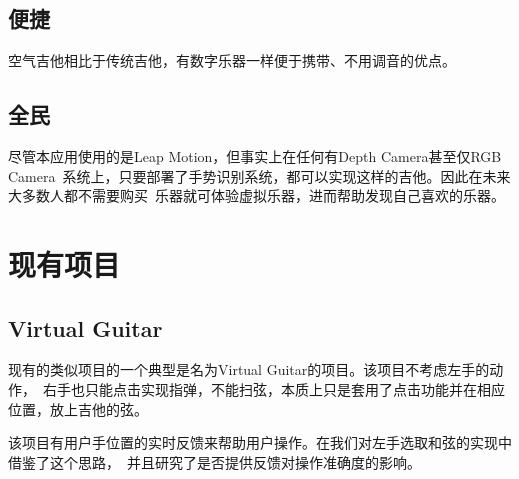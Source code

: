         \subsection{便捷}
        空气吉他相比于传统吉他，有数字乐器一样便于携带、不用调音的优点。

        \subsection{全民}
        尽管本应用使用的是Leap Motion，但事实上在任何有Depth Camera甚至仅RGB Camera\
        系统上，只要部署了手势识别系统，都可以实现这样的吉他。因此在未来大多数人都不需要购买\
        乐器就可体验虚拟乐器，进而帮助发现自己喜欢的乐器。

    \section{现有项目}

        \subsection{Virtual Guitar}
        现有的类似项目的一个典型是名为Virtual Guitar的项目。该项目不考虑左手的动作，\
        右手也只能点击实现指弹，不能扫弦，本质上只是套用了点击功能并在相应位置，放上吉他的弦。

        该项目有用户手位置的实时反馈来帮助用户操作。在我们对左手选取和弦的实现中借鉴了这个思路，\
        并且研究了是否提供反馈对操作准确度的影响。
